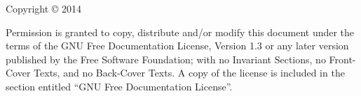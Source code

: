 
\begin{titlepage}

\begin{center}

\huge \doctitle

\Large \docsubtitle

\bigskip

\normalsize \docauthor

\end{center}

\end{titlepage}

\thispagestyle{empty}

\noindent Copyright \copyright{} 2014\ \ \docauthor

\bigskip

\noindent Permission is granted to copy, distribute and/or modify this
document under the terms of the GNU Free Documentation License, Version
1.3 or any later version published by the Free Software Foundation; with
no Invariant Sections, no Front-Cover Texts, and no Back-Cover Texts.  A
copy of the license is included in the section entitled ``GNU Free
Documentation License''.


